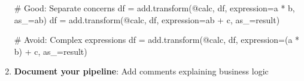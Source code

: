 \documentclass[
  letterpaper,
]{scrbook}
\newenvironment{Shaded}{\begin{snugshade}}{\end{snugshade}}
\newcommand{\CommentTok}[1]{\textcolor[rgb]{0.37,0.37,0.37}{#1}}
\newcommand{\NormalTok}[1]{\textcolor[rgb]{0.00,0.23,0.31}{#1}}
\newcommand{\OperatorTok}[1]{\textcolor[rgb]{0.37,0.37,0.37}{#1}}
\newcommand{\StringTok}[1]{\textcolor[rgb]{0.13,0.47,0.30}{#1}}
\begin{document}
\begin{enumerate}
\begin{Shaded}
\begin{Highlighting}[]
\CommentTok{\# Good: Separate concerns}
\NormalTok{df }\OperatorTok{=}\NormalTok{ add.transform(}\StringTok{\textquotesingle{}@calc\textquotesingle{}}\NormalTok{, df, expression}\OperatorTok{=}\StringTok{\textquotesingle{}a * b\textquotesingle{}}\NormalTok{, as\_}\OperatorTok{=}\StringTok{\textquotesingle{}ab\textquotesingle{}}\NormalTok{)}
\NormalTok{df }\OperatorTok{=}\NormalTok{ add.transform(}\StringTok{\textquotesingle{}@calc\textquotesingle{}}\NormalTok{, df, expression}\OperatorTok{=}\StringTok{\textquotesingle{}ab + c\textquotesingle{}}\NormalTok{, as\_}\OperatorTok{=}\StringTok{\textquotesingle{}result\textquotesingle{}}\NormalTok{)}

\CommentTok{\# Avoid: Complex expressions}
\NormalTok{df }\OperatorTok{=}\NormalTok{ add.transform(}\StringTok{\textquotesingle{}@calc\textquotesingle{}}\NormalTok{, df, expression}\OperatorTok{=}\StringTok{\textquotesingle{}(a * b) + c\textquotesingle{}}\NormalTok{, as\_}\OperatorTok{=}\StringTok{\textquotesingle{}result\textquotesingle{}}\NormalTok{)}
\end{Highlighting}
\end{Shaded}
\item
  \textbf{Document your pipeline}: Add comments explaining business
  logic

\begin{Shaded}
\end{Shaded}
\end{enumerate}
\end{document}
